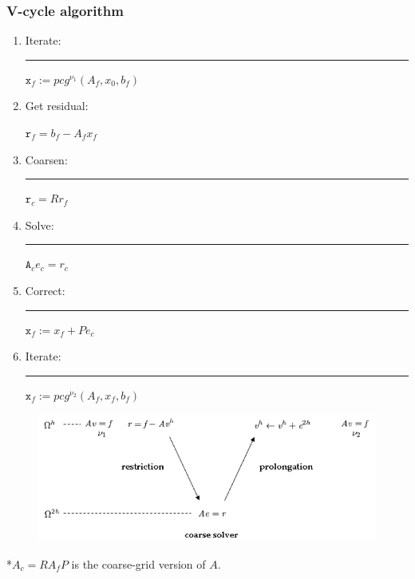 \begin{frame}
\frametitle{V-cycle algorithm}
\begin{enumerate}
  \item {Iterate: \rule{0.8cm}{0pt} ${\texttt x_f :=  pcg^{\nu_1}(A_f, x_0, b_f)}$}
  \item Get residual: \rule{0cm}{0pt} ${\texttt r_f = b_f - A_f x_f}$
  \item Coarsen: \rule{0.6cm}{0pt} ${\texttt r_c = R r_f}$
  \item Solve: \rule{1cm}{0pt} ${\texttt A_c e_c = r_c}$
  \item Correct: \rule{0.7cm}{0pt} ${\texttt x_f := x_f + Pe_c}$
  \item Iterate: \rule{0.8cm}{0pt} ${\texttt x_f := pcg^{\nu_2}(A_f, x_f, b_f)}$
\end{enumerate}

\begin{figure}
 \includegraphics[scale=0.4]{figures/v-cycle1}
\end{figure}

\begin{footnotesize}
*$A_c = RA_fP$ is the coarse-grid version of $A$.
\end{footnotesize}
\end{frame}

